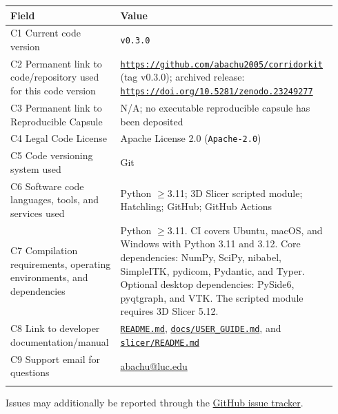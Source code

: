 \documentclass[preprint,12pt]{elsarticle}
\begin{document}
\begingroup
\small
\renewcommand{\arraystretch}{1.2}
\begin{longtable}{@{}>{\raggedright\arraybackslash}p{0.29\linewidth}@{\hspace{0.05\linewidth}}>{\raggedright\arraybackslash}p{0.65\linewidth}@{}}
\toprule
Field & Value \\
\midrule
C1 Current code version & \texttt{v0.3.0} \\
\addlinespace[4pt]
C2 Permanent link to code/repository used for this code version & \href{https://github.com/abachu2005/corridorkit}{\nolinkurl{https://github.com/abachu2005/corridorkit}} (tag v0.3.0); archived release: \href{https://doi.org/10.5281/zenodo.23249277}{\nolinkurl{https://doi.org/10.5281/zenodo.23249277}} \\
\addlinespace[4pt]
C3 Permanent link to Reproducible Capsule & N/A; no executable reproducible capsule has been deposited \\
\addlinespace[4pt]
C4 Legal Code License & Apache License 2.0 (\texttt{Apache-2.0}) \\
\addlinespace[4pt]
C5 Code versioning system used & Git \\
\addlinespace[4pt]
C6 Software code languages, tools, and services used & Python $\geq$3.11; 3D Slicer scripted module; Hatchling; GitHub; GitHub Actions \\
\addlinespace[4pt]
C7 Compilation requirements, operating environments, and dependencies & Python $\geq$3.11. CI covers Ubuntu, macOS, and Windows with Python 3.11 and 3.12. Core dependencies: NumPy, SciPy, nibabel, SimpleITK, pydicom, Pydantic, and Typer. Optional desktop dependencies: PySide6, pyqtgraph, and VTK. The scripted module requires 3D Slicer 5.12. \\
\addlinespace[4pt]
C8 Link to developer documentation/manual & \href{https://github.com/abachu2005/corridorkit/blob/v0.3.0/README.md}{\texttt{README.md}}, \href{https://github.com/abachu2005/corridorkit/blob/v0.3.0/docs/USER_GUIDE.md}{\texttt{docs/USER\_GUIDE.md}}, and \href{https://github.com/abachu2005/corridorkit/blob/v0.3.0/slicer/README.md}{\texttt{slicer/README.md}} \\
\addlinespace[4pt]
C9 Support email for questions & \href{mailto:abachu@luc.edu}{abachu@luc.edu} \\
\addlinespace[4pt]
\bottomrule
\end{longtable}
\endgroup

Issues may additionally be reported through the \href{https://github.com/abachu2005/corridorkit/issues}{GitHub issue tracker}.
\end{document}
